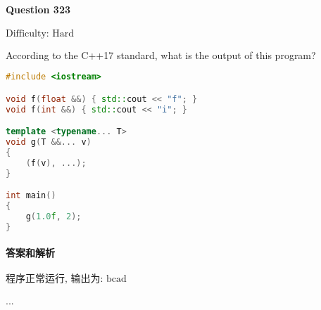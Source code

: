 \documentclass{article}
\begin{document}
	
	\paragraph*{Question 323} $\boxed{\text{Difficulty: Hard}} $			
	
	According to the C++17 standard, what is the output of this program?
	
	\begin{lstlisting}[language=C++]  		
#include <iostream>

void f(float &&) { std::cout << "f"; }
void f(int &&) { std::cout << "i"; }

template <typename... T>
void g(T &&... v)
{
	(f(v), ...);
}

int main()
{
	g(1.0f, 2);
}
	\end{lstlisting}
	
	
	\paragraph*{答案和解析} $\boxed{\text{程序正常运行, 输出为: bcad}} $
	
	...
\end{document}
